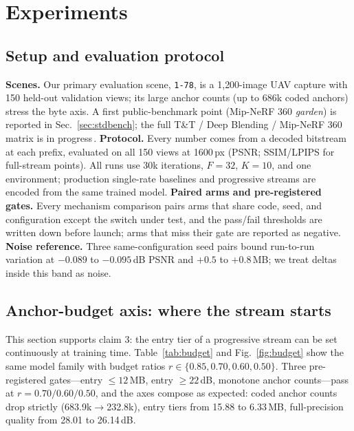 \section{Experiments}
\label{sec:experiments}

\subsection{Setup and evaluation protocol}
\label{sec:setup}

\textbf{Scenes.}
Our primary evaluation scene, \texttt{1-78}, is a 1{,}200-image UAV capture with 150 held-out validation views; its large anchor counts (up to $686$k coded anchors) stress the byte axis.
A first public-benchmark point (Mip-NeRF 360 \emph{garden}) is reported in Sec.~\ref{sec:stdbench}; the full T\&T / Deep Blending / Mip-NeRF 360 matrix is in progress\,.
\textbf{Protocol.}
Every number comes from a decoded bitstream at each prefix, evaluated on all 150 views at 1600\,px (PSNR; SSIM/LPIPS for full-stream points).
All runs use 30k iterations, $F{=}32$, $K{=}10$, and one environment; production single-rate baselines and progressive streams are encoded from the same trained model.
\textbf{Paired arms and pre-registered gates.}
Every mechanism comparison pairs arms that share code, seed, and configuration except the switch under test, and the pass/fail thresholds are written down before launch; arms that miss their gate are reported as negative.
\textbf{Noise reference.}
Three same-configuration seed pairs bound run-to-run variation at $-0.089$ to $-0.095$\,dB PSNR and $+0.5$ to $+0.8$\,MB; we treat deltas inside this band as noise.

\subsection{Anchor-budget axis: where the stream starts}
\label{sec:budget-exp}

This section supports claim 3: the entry tier of a progressive stream can be set continuously at training time.
Table~\ref{tab:budget} and Fig.~\ref{fig:budget} show the same model family with budget ratios $r \in \{0.85, 0.70, 0.60, 0.50\}$.
Three pre-registered gates---entry $\le 12$\,MB, entry $\ge 22$\,dB, monotone anchor counts---pass at $r{=}0.70/0.60/0.50$, and the axes compose as expected: coded anchor counts drop strictly (683.9k$\to$232.8k), entry tiers from 15.88 to 6.33\,MB, full-precision quality from 28.01 to 26.14\,dB.

